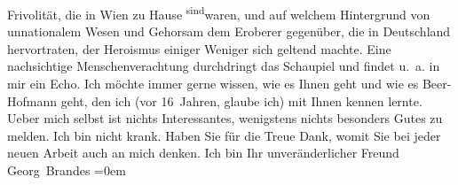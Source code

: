 \begin{ledgroupsized}[t]{13cm}
                    Frivolität, die in Wien zu Hause \substVorne{}\textsuperscript{sind}\substDazwischen{}waren\substHinten{}, und auf welchem Hintergrund von unnationalem Wesen und Gehorsam dem
                    Eroberer gegenüber, die in Deutschland
                    hervortraten, der Heroismus einiger Weniger sich geltend machte. Eine
                    nachsichtige Menschenverachtung durchdringt das Schaupiel und findet u. a. in
                    mir ein Echo.\pend
           \pstart
           Ich möchte immer gerne wissen, wie es {\pb}Ihnen geht und wie es Beer-Hofmann geht, den ich (vor 16 Jahren,
                    glaube ich) mit Ihnen kennen lernte.\pend
           \pstart
           Ueber mich selbst ist nichts Interessantes, wenigstens nichts besonders Gutes zu
                    melden. Ich bin nicht krank.\pend
           \pstart
           Haben Sie für die Treue Dank, womit Sie bei jeder neuen Arbeit auch an mich
                    denken.\pend
           \pstart
           Ich bin Ihr unveränderlicher Freund{\\[\baselineskip]}\spacefill\mbox{Georg Brandes}\pend
           \leftskip=0em{}
         
         \endnumbering{}\end{ledgroupsized}  \newcommand{\dateiname}{L01991}\newcommand{\titel}{Georg Brandes an Arthur Schnitzler, 18. 12. 1910}\newcommand{\editorInnen}{Martin Anton Müller und Gerd-Hermann Susen}
      